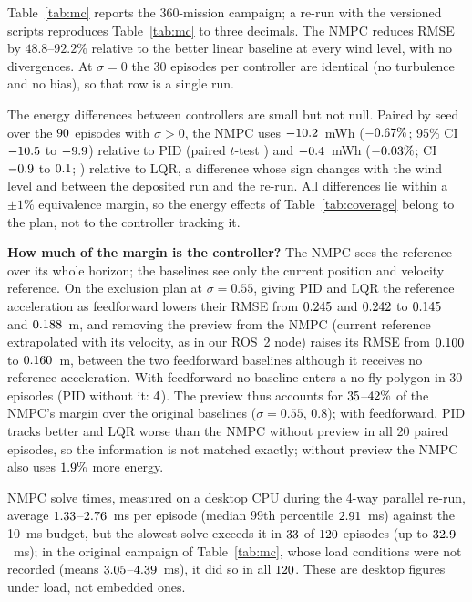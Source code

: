 \documentclass[\PAPERCLASSOPT]{IEEEtran}
\begin{document}
Table~\ref{tab:mc} reports the 360-mission campaign; a re-run with the
versioned scripts reproduces Table~\ref{tab:mc} to three decimals. The NMPC
reduces RMSE by $48.8$--$92.2\%$ relative to the better linear baseline at every
wind level, with no divergences. At $\sigma=0$ the 30 episodes per controller are
identical (no turbulence and no bias), so that row is a single run.

The energy differences between controllers are small but not null. Paired by
seed over the $90$ episodes with $\sigma>0$, the NMPC uses
$-10.2$~mWh ($-0.67\%$; 95\% CI $-10.5$ to $-9.9$) relative to PID
(paired $t$-test \enNPp) and $-0.4$~mWh ($-0.03\%$; CI $-0.9$ to
$0.1$; \enNLp) relative to LQR, a difference whose sign changes with the wind
level and between the deposited run and the re-run. All differences lie within a $\pm1\%$
equivalence margin, so the energy effects of Table~\ref{tab:coverage} belong to
the plan, not to the controller tracking it.

\textbf{How much of the margin is the controller?} The NMPC sees the reference
over its whole horizon; the baselines see only the current position and
velocity reference. On the exclusion plan at $\sigma=0.55$, giving PID and LQR
the reference acceleration as feedforward lowers their RMSE from $0.245$ and
$0.242$ to $0.145$ and $0.188$~m, and removing the preview from the
NMPC (current reference extrapolated with its velocity, as in our ROS~2 node)
raises its RMSE from $0.100$ to $0.160$~m, between the two
feedforward baselines although it receives no reference acceleration. With feedforward no baseline enters a no-fly polygon in
30 episodes (PID without it: $4$). The preview thus accounts for
$35$--$42\%$ of the NMPC's margin over the original
baselines ($\sigma=0.55$, $0.8$); with feedforward, PID tracks better and LQR
worse than the NMPC without preview in all 20 paired episodes, so the
information is not matched exactly; without preview the NMPC also uses
$1.9\%$ more energy.

NMPC solve times, measured on a desktop CPU during the 4-way parallel re-run,
average $1.33$--$2.76$~ms per episode (median 99th percentile
$2.91$~ms) against the 10~ms budget, but the slowest solve exceeds it
in $33$ of $120$ episodes (up to $32.9$~ms); in the
original campaign of Table~\ref{tab:mc}, whose load conditions were not recorded (means
$3.05$--$4.39$~ms), it did so in all $120$.
These are desktop figures under load, not embedded ones.
\end{document}
